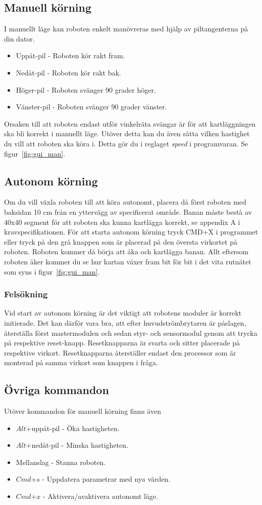 \documentclass[a4paper,12pt,fleqn]{article}
\begin{document}
\subsection*{Manuell körning}
I manuellt läge kan roboten enkelt manövreras med hjälp av piltangenterna på din dator.
\begin{itemize}
	\item Uppåt-pil - Roboten kör rakt fram.
	\item Nedåt-pil - Roboten kör rakt bak.
	\item Höger-pil - Roboten svänger 90 grader höger.
	\item Vänster-pil - Roboten svänger 90 grader vänster.
\end{itemize}
Orsaken till att roboten endast utför vinkelräta svängar är för att kartläggningen ska bli korrekt i manuellt läge. Utöver detta kan du även sätta vilken hastighet du vill att roboten ska köra i. Detta gör du i reglaget \emph{speed} i programvaran. Se figur~\ref{fig:gui_man}. 
	
\subsection*{Autonom körning}
Om du vill växla roboten till att köra autonomt, placera då först roboten med baksidan 10 cm från en yttervägg av specificerat område. Banan måste bestå av 40x40 segment för att roboten ska kunna kartlägga korrekt, se appendix A i kravspecifikationen. För att starta autonom körning tryck CMD+X i programmet eller tryck på den grå knappen som är placerad på den översta virkortet på roboten. Roboten kommer då börja att åka och kartlägga banan. Allt eftersom roboten åker kommer du se hur kartan växer fram bit för bit i det vita rutnätet som syns i figur~\ref{fig:gui_man}. 

\subsubsection*{Felsökning}
Vid start av autonom körning är det viktigt att robotens moduler är korrekt initierade. Det kan därför vara bra, att efter huvudströmbrytaren är påslagen, återställa först mastermodulen och sedan styr- och sensormodul genom att trycka på respektive reset-knapp. Resetknapparna är svarta och sitter placerade på respektive virkort. Resetknapparna återställer endast den processor som är monterad på samma virkort som knappen i fråga.

\subsection*{Övriga kommandon}
Utöver kommandon för manuell körning finns även
\begin{itemize}
	\item $Alt$+uppåt-pil - Öka hastigheten.
	\item $Alt$+nedåt-pil - Minska hastigheten.
	\item Mellanslag - Stanna roboten.
	\item $Cmd$+$s$ - Uppdatera parametrar med nya värden.
	\item $Cmd$+$x$ - Aktivera/avaktivera autonomt läge.
\end{itemize}
\newpage
\end{document}

